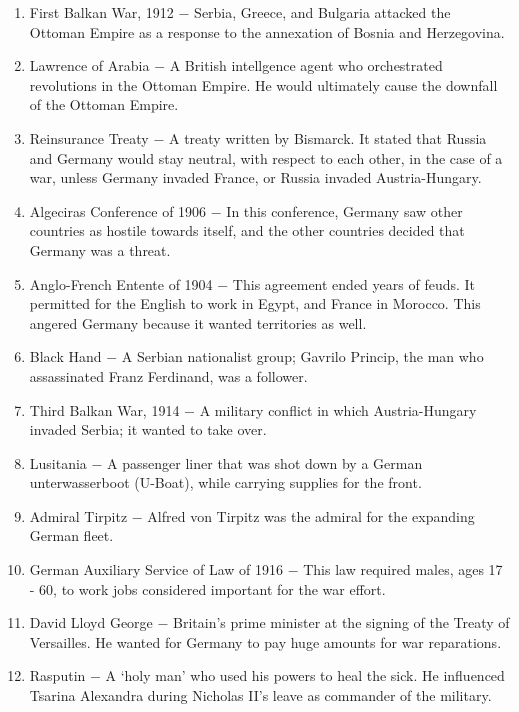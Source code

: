 \documentclass[12pt]{article}
\begin{document}
\begin{enumerate}
\item First Balkan War, 1912 $-$ Serbia, Greece, and Bulgaria attacked the Ottoman Empire as a response to the annexation of Bosnia and Herzegovina.

\item Lawrence of Arabia $-$ A British intellgence agent who orchestrated revolutions in the Ottoman Empire. He would ultimately cause the downfall of the Ottoman Empire. 

\item Reinsurance Treaty $-$ A treaty written by Bismarck. It stated that Russia and Germany would stay neutral, with respect to each other, in the case of a war, unless Germany invaded France, or Russia invaded Austria-Hungary.

\item Algeciras Conference of 1906 $-$ In this conference, Germany saw other countries as hostile towards itself, and the other countries decided that Germany was a threat.

\item Anglo-French Entente of 1904 $-$ This agreement ended years of feuds. It permitted for the English to work in Egypt, and France in Morocco. This angered Germany because it wanted territories as well.

\item Black Hand $-$ A Serbian nationalist group; Gavrilo Princip, the man who assassinated Franz Ferdinand, was a follower.

\item Third Balkan War, 1914 $-$ A military conflict in which Austria-Hungary invaded Serbia; it wanted to take over.

\item Lusitania $-$ A passenger liner that was shot down by a German unterwasserboot (U-Boat), while carrying supplies for the front.

\item Admiral Tirpitz $-$ Alfred von Tirpitz was the admiral for the expanding German fleet.

\item German Auxiliary Service of Law of 1916 $-$ This law required males, ages 17 - 60, to work jobs considered important for the war effort.

\item David Lloyd George $-$ Britain's prime minister at the signing of the Treaty of Versailles. He wanted for Germany to pay huge amounts for war reparations.

\item Rasputin $-$ A `holy man' who used his powers to heal the sick. He influenced Tsarina Alexandra during Nicholas II's leave as commander of the military.


\end{enumerate}
\end{document}
